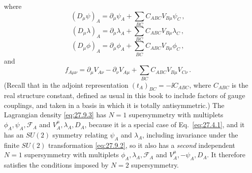 where
\begin{equation}
  (D_\mu\psi)_A
  =\partial_\mu\psi_A+\sum_{BC}C_{ABC}V_{B\mu}\psi_C\,,
  \tag{27.9.4}\label{eq:27.9.4}
\end{equation}
\begin{equation}
  (D_\mu\lambda)_A
  =\partial_\mu\lambda_A+\sum_{BC}C_{ABC}V_{B\mu}\lambda_C\,,
  \tag{27.9.5}\label{eq:27.9.5}
\end{equation}
\begin{equation}
  (D_\mu\phi)_A
  =\partial_\mu\phi_A+\sum_{BC}C_{ABC}V_{B\mu}\phi_C\,,
  \tag{27.9.6}\label{eq:27.9.6}
\end{equation}
and
\begin{equation}
  f_{A\mu\nu}
  =\partial_\mu V_{A\nu}-\partial_\nu V_{A\mu}
  +\sum_{BC}C_{ABC}V_{B\mu}V_{C\nu}\,.
  \tag{27.9.7}\label{eq:27.9.7}
\end{equation}
(Recall that in the adjoint representation
\((t_A)_{BC}=-\ii C_{ABC}\), where \(C_{ABC}\) is the real structure constant,
defined as usual in this book to include factors of gauge couplings, and
taken in a basis in which it is totally antisymmetric.) The Lagrangian
density \eqref{eq:27.9.3} has \(N=1\) supersymmetry with multiplets
\(\phi_A,\psi_A,\mathcal{F}_A\) and \(V_A^\mu,\lambda_A,D_A\), because it is a
special case of Eq.~\eqref{eq:27.4.1}, and it has an \(SU(2)\) symmetry
relating \(\psi_A\) and \(\lambda_A\), including invariance under the finite
\(SU(2)\) transformation \eqref{eq:27.9.2}, so it also has a \emph{second}
independent \(N=1\) supersymmetry with multiplets
\(\phi_A,\lambda_A,\mathcal{F}_A\) and \(V_A^\mu,-\psi_A,D_A\). It therefore
satisfies the conditions imposed by \(N=2\) supersymmetry.

